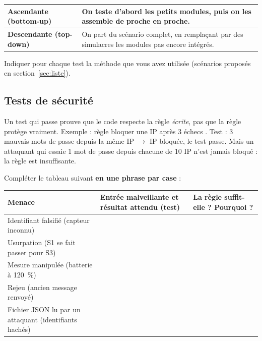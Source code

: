 \documentclass[11pt,a4paper]{article}
\begin{document}
\begin{center}
\renewcommand{\arraystretch}{1.25}
\begin{tabularx}{\textwidth}{|>{\bfseries}p{3.2cm}|X|}
\hline
Ascendante (bottom-up) & On teste d'abord les petits modules, puis on les assemble de proche en proche.\\
\hline
Descendante (top-down) & On part du scénario complet, en remplaçant par des simulacres les modules pas encore intégrés.\\
\hline
\end{tabularx}
\end{center}

Indiquer pour chaque test la méthode que vous avez utilisée (scénarios proposés en section~\ref{sec:liste}).

\subsection{Tests de sécurité}

Un test qui passe prouve que le code respecte la règle \emph{écrite}, pas que la règle
protège vraiment. Exemple : règle \og bloquer une IP après 3 échecs \fg{}.
Test : 3 mauvais mots de passe depuis la même IP $\rightarrow$ IP bloquée, le test passe.
Mais un attaquant qui essaie 1 mot de passe depuis chacune de 10 IP n'est jamais bloqué :
la règle est insuffisante.

Compléter le tableau suivant \textbf{en une phrase par case} :

\begin{center}
\renewcommand{\arraystretch}{1.3}
\begin{tabularx}{\textwidth}{|p{3.6cm}|X|X|}
\hline
\rowcolor{blue!12} Menace & Entrée malveillante et résultat attendu (test) & La règle suffit-elle ? Pourquoi ?\\
\hline
Identifiant falsifié (capteur inconnu) & \rule{0pt}{1.2cm} &\\
\hline
Usurpation (S1 se fait passer pour S3) & \rule{0pt}{1.2cm} &\\
\hline
Mesure manipulée (batterie à 120~\%) & \rule{0pt}{1.2cm} &\\
\hline
Rejeu (ancien message renvoyé) & \rule{0pt}{1.2cm} &\\
\hline
Fichier JSON lu par un attaquant (identifiants hachés) & \rule{0pt}{1.2cm} &\\
\hline
\end{tabularx}
\end{center}
\end{document}
